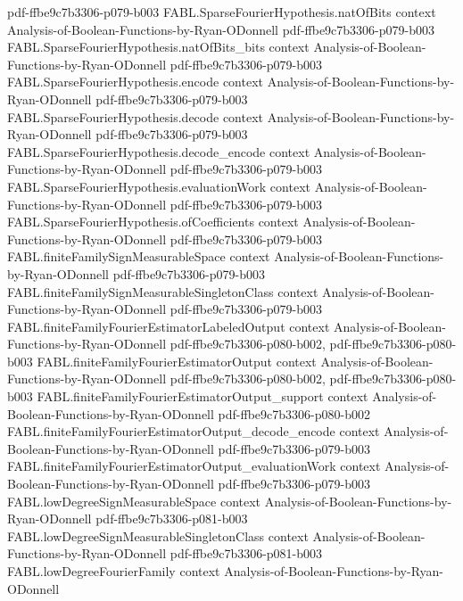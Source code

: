 \begin{theorem}
  {pdf-ffbe9c7b3306-p079-b003}
\proofstep
  {FABL.SparseFourierHypothesis.natOfBits}
  {context}
  {Analysis-of-Boolean-Functions-by-Ryan-ODonnell}
  {pdf-ffbe9c7b3306-p079-b003}
\proofstep
  {FABL.SparseFourierHypothesis.natOfBits_bits}
  {context}
  {Analysis-of-Boolean-Functions-by-Ryan-ODonnell}
  {pdf-ffbe9c7b3306-p079-b003}
\proofstep
  {FABL.SparseFourierHypothesis.encode}
  {context}
  {Analysis-of-Boolean-Functions-by-Ryan-ODonnell}
  {pdf-ffbe9c7b3306-p079-b003}
\proofstep
  {FABL.SparseFourierHypothesis.decode}
  {context}
  {Analysis-of-Boolean-Functions-by-Ryan-ODonnell}
  {pdf-ffbe9c7b3306-p079-b003}
\proofstep
  {FABL.SparseFourierHypothesis.decode_encode}
  {context}
  {Analysis-of-Boolean-Functions-by-Ryan-ODonnell}
  {pdf-ffbe9c7b3306-p079-b003}
\proofstep
  {FABL.SparseFourierHypothesis.evaluationWork}
  {context}
  {Analysis-of-Boolean-Functions-by-Ryan-ODonnell}
  {pdf-ffbe9c7b3306-p079-b003}
\proofstep
  {FABL.SparseFourierHypothesis.ofCoefficients}
  {context}
  {Analysis-of-Boolean-Functions-by-Ryan-ODonnell}
  {pdf-ffbe9c7b3306-p079-b003}
\proofstep
  {FABL.finiteFamilySignMeasurableSpace}
  {context}
  {Analysis-of-Boolean-Functions-by-Ryan-ODonnell}
  {pdf-ffbe9c7b3306-p079-b003}
\proofstep
  {FABL.finiteFamilySignMeasurableSingletonClass}
  {context}
  {Analysis-of-Boolean-Functions-by-Ryan-ODonnell}
  {pdf-ffbe9c7b3306-p079-b003}
\proofstep
  {FABL.finiteFamilyFourierEstimatorLabeledOutput}
  {context}
  {Analysis-of-Boolean-Functions-by-Ryan-ODonnell}
  {pdf-ffbe9c7b3306-p080-b002,
    pdf-ffbe9c7b3306-p080-b003}
\proofstep
  {FABL.finiteFamilyFourierEstimatorOutput}
  {context}
  {Analysis-of-Boolean-Functions-by-Ryan-ODonnell}
  {pdf-ffbe9c7b3306-p080-b002,
    pdf-ffbe9c7b3306-p080-b003}
\proofstep
  {FABL.finiteFamilyFourierEstimatorOutput_support}
  {context}
  {Analysis-of-Boolean-Functions-by-Ryan-ODonnell}
  {pdf-ffbe9c7b3306-p080-b002}
\proofstep
  {FABL.finiteFamilyFourierEstimatorOutput_decode_encode}
  {context}
  {Analysis-of-Boolean-Functions-by-Ryan-ODonnell}
  {pdf-ffbe9c7b3306-p079-b003}
\proofstep
  {FABL.finiteFamilyFourierEstimatorOutput_evaluationWork}
  {context}
  {Analysis-of-Boolean-Functions-by-Ryan-ODonnell}
  {pdf-ffbe9c7b3306-p079-b003}
\proofstep
  {FABL.lowDegreeSignMeasurableSpace}
  {context}
  {Analysis-of-Boolean-Functions-by-Ryan-ODonnell}
  {pdf-ffbe9c7b3306-p081-b003}
\proofstep
  {FABL.lowDegreeSignMeasurableSingletonClass}
  {context}
  {Analysis-of-Boolean-Functions-by-Ryan-ODonnell}
  {pdf-ffbe9c7b3306-p081-b003}
\proofstep
  {FABL.lowDegreeFourierFamily}
  {context}
  {Analysis-of-Boolean-Functions-by-Ryan-ODonnell}

\end{theorem}
